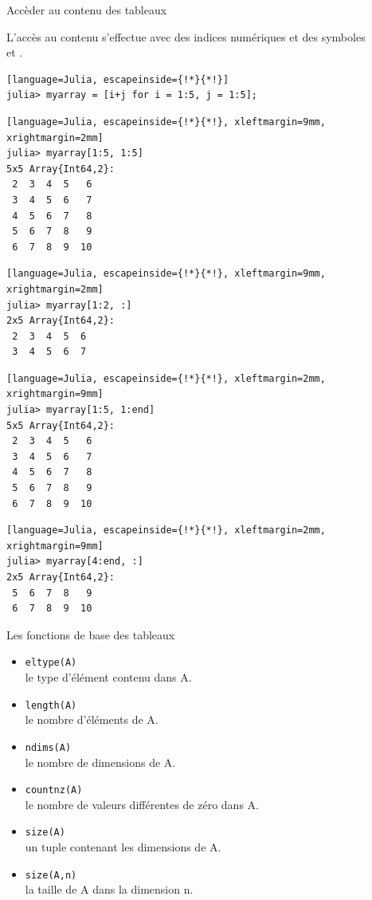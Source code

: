 \begin{frame}[containsverbatim]{Accèder au contenu des tableaux}
\par{L'accès au contenu s'effectue avec des indices numériques et des symboles \\\quad \cmdb{\hspace{-1.5ex}:} et .}
\begin{lstlisting}[language=Julia, escapeinside={!*}{*!}]
julia> myarray = [i+j for i = 1:5, j = 1:5];
\end{lstlisting}
\vspace{-2ex}
\begin{multicols}{2}
\begin{lstlisting}[language=Julia, escapeinside={!*}{*!}, xleftmargin=9mm, xrightmargin=2mm]
julia> myarray[1:5, 1:5]
5x5 Array{Int64,2}:
 2  3  4  5   6
 3  4  5  6   7
 4  5  6  7   8
 5  6  7  8   9
 6  7  8  9  10
\end{lstlisting}
\begin{lstlisting}[language=Julia, escapeinside={!*}{*!}, xleftmargin=9mm, xrightmargin=2mm]
julia> myarray[1:2, :]
2x5 Array{Int64,2}:
 2  3  4  5  6
 3  4  5  6  7
\end{lstlisting}
\begin{lstlisting}[language=Julia, escapeinside={!*}{*!}, xleftmargin=2mm, xrightmargin=9mm]
julia> myarray[1:5, 1:end]
5x5 Array{Int64,2}:
 2  3  4  5   6
 3  4  5  6   7
 4  5  6  7   8
 5  6  7  8   9
 6  7  8  9  10
\end{lstlisting}
\begin{lstlisting}[language=Julia, escapeinside={!*}{*!}, xleftmargin=2mm, xrightmargin=9mm]
julia> myarray[4:end, :]
2x5 Array{Int64,2}:
 5  6  7  8   9
 6  7  8  9  10
\end{lstlisting}
\end{multicols}
\end{frame}


\begin{frame}[containsverbatim]{Les fonctions de base des tableaux}
\begin{itemize}
\item \texttt{eltype(A)} \\\qquad le type d'élément contenu dans A.
\item \texttt{length(A)} \\\qquad le nombre d'éléments de A.
\item \texttt{ndims(A)} \\\qquad le nombre de dimensions de A.
\item \texttt{countnz(A)} \\\qquad le nombre de valeurs différentes de zéro dans A.
\item \texttt{size(A)} \\\qquad un tuple contenant les dimensions de A.
\item \texttt{size(A,n)} \\\qquad la taille de A dans la dimension n.
\end{itemize}
\end{frame}


